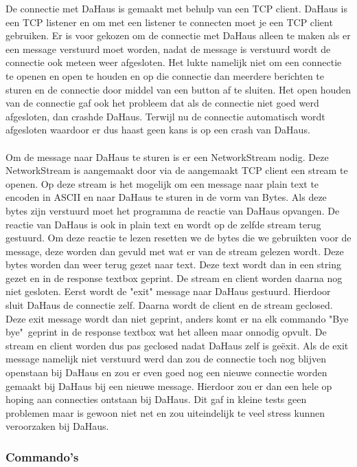 \documentclass[11pt]{article}
\begin{document}
	De connectie met DaHaus is gemaakt met behulp van een TCP client. DaHaus is een TCP listener en om met een listener te connecten moet je een TCP client gebruiken. Er is voor gekozen om de connectie met DaHaus alleen te maken als er een message verstuurd moet worden, nadat de message is verstuurd wordt de connectie ook meteen weer afgesloten. Het lukte namelijk niet om een connectie te openen en open te houden en op die connectie dan meerdere berichten te sturen en de connectie door middel van een button af te sluiten. Het open houden van de connectie gaf ook het probleem dat als de connectie niet goed werd afgesloten, dan crashde DaHaus. Terwijl nu de connectie automatisch wordt afgesloten waardoor er dus haast geen kans is op een crash van DaHaus.
	\\
	\\
	Om de message naar DaHaus te sturen is er een NetworkStream nodig.
	Deze NetworkStream is aangemaakt door via de aangemaakt TCP client een stream te openen. Op deze stream is het mogelijk om een message naar plain text te encoden in ASCII en naar DaHaus te sturen in de vorm van Bytes. Als deze bytes zijn verstuurd moet het programma de reactie van DaHaus opvangen. De reactie van DaHaus is ook in plain text en wordt op de zelfde stream terug gestuurd. Om deze reactie te lezen resetten we de bytes die we gebruikten voor de message, deze worden dan gevuld met wat er van de stream gelezen wordt. Deze bytes worden dan weer terug gezet naar text. Deze text wordt dan in een string gezet en in de response textbox geprint. De stream en client worden daarna nog niet gesloten. Eerst wordt de "exit" message naar DaHaus gestuurd. Hierdoor sluit DaHaus de connectie zelf. Daarna wordt de client en de stream geclosed. Deze exit message wordt dan niet geprint, anders komt er na elk commando "Bye bye"\  geprint in de response textbox wat het alleen maar onnodig opvult. De stream en client worden dus pas geclosed nadat DaHaus zelf is ge\"{e}xit. Als de exit message namelijk niet verstuurd werd dan zou de connectie toch nog blijven openstaan bij DaHaus en zou er even goed nog een nieuwe connectie worden gemaakt bij DaHaus bij een nieuwe message. Hierdoor zou er dan een hele op hoping aan connecties ontstaan bij DaHaus. Dit gaf in kleine tests geen problemen maar is gewoon niet net en zou uiteindelijk te veel stress kunnen veroorzaken bij DaHaus. 
	
	\subsubsection{Commando's}
	
\end{document}
